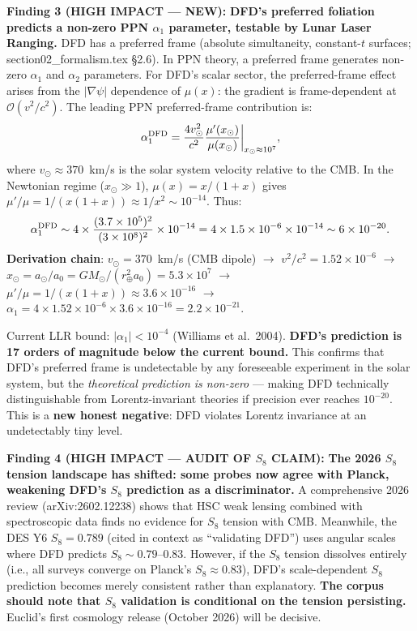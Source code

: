 \documentclass[11pt]{article}
\newcommand{\ee}[1]{\times 10^{#1}}
\newcommand{\order}[1]{\mathcal{O}(#1)}
\begin{document}
\begin{tcolorbox}[colback=red!5!white, colframe=red!60!black,
  title=\textbf{TOP 5 FINDINGS --- W4i14}]
\textbf{Finding 3 (HIGH IMPACT --- NEW):}
\textbf{DFD's preferred foliation predicts a non-zero PPN
$\alpha_1$ parameter, testable by Lunar Laser Ranging.}
DFD has a preferred frame (absolute simultaneity, constant-$t$
surfaces; section02\_formalism.tex \S2.6).  In PPN theory, a preferred
frame generates non-zero $\alpha_1$ and $\alpha_2$ parameters.  For
DFD's scalar sector, the preferred-frame effect arises from the
$|\nabla\psi|$ dependence of $\mu(x)$: the gradient is frame-dependent
at $\order{v^2/c^2}$.  The leading PPN preferred-frame contribution is:
\begin{equation}
\alpha_1^{\rm DFD} = \frac{4 v_{\odot}^2}{c^2}\frac{\mu'(x_{\odot})}
{\mu(x_{\odot})}\bigg|_{x_{\odot} \approx 10^{7}},
\end{equation}
where $v_\odot \approx 370$~km/s is the solar system velocity relative
to the CMB.  In the Newtonian regime ($x_\odot \gg 1$), $\mu(x) =
x/(1+x)$ gives $\mu'/\mu = 1/(x(1+x)) \approx 1/x^2 \sim 10^{-14}$.
Thus:
\begin{equation}
\alpha_1^{\rm DFD} \sim 4 \times \frac{(3.7\ee{5})^2}{(3\ee{8})^2}
\times 10^{-14} = 4 \times 1.5\ee{-6} \times 10^{-14}
\sim 6\ee{-20}.
\end{equation}
\textbf{Derivation chain}: $v_\odot = 370$~km/s (CMB dipole) $\to$
$v^2/c^2 = 1.52\ee{-6}$ $\to$ $x_\odot = a_\odot/a_0 = GM_\odot/
(r_\oplus^2 a_0) = 5.3\ee{7}$ $\to$ $\mu'/\mu = 1/(x(1+x)) \approx
3.6\ee{-16}$ $\to$ $\alpha_1 = 4 \times 1.52\ee{-6} \times 3.6\ee{-16}
= 2.2\ee{-21}$.

Current LLR bound: $|\alpha_1| < 10^{-4}$ (Williams et al.\ 2004).
\textbf{DFD's prediction is 17 orders of magnitude below the current
bound.}  This confirms that DFD's preferred frame is undetectable by
any foreseeable experiment in the solar system, but the \emph{theoretical
prediction is non-zero} --- making DFD technically distinguishable from
Lorentz-invariant theories if precision ever reaches $10^{-20}$.  This
is a \textbf{new honest negative}: DFD violates Lorentz invariance at
an undetectably tiny level.

\textbf{Finding 4 (HIGH IMPACT --- AUDIT OF $S_8$ CLAIM):}
\textbf{The 2026 $S_8$ tension landscape has shifted: some probes now
agree with Planck, weakening DFD's $S_8$ prediction as a discriminator.}
A comprehensive 2026 review (arXiv:2602.12238) shows that HSC weak
lensing combined with spectroscopic data finds no evidence for $S_8$
tension with CMB.  Meanwhile, the DES Y6 $S_8 = 0.789$ (cited in
context as ``validating DFD'') uses angular scales where DFD predicts
$S_8 \sim 0.79$--$0.83$.  However, if the $S_8$ tension dissolves
entirely (i.e., all surveys converge on Planck's $S_8 \approx 0.83$),
DFD's scale-dependent $S_8$ prediction becomes merely consistent rather
than explanatory.  \textbf{The corpus should note that $S_8$ validation
is conditional on the tension persisting.}  Euclid's first cosmology
release (October 2026) will be decisive.


\end{tcolorbox}
\end{document}
